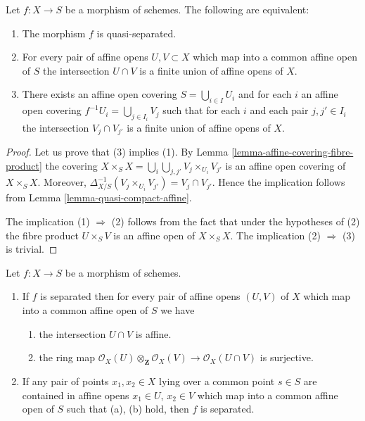 \begin{lemma}
\label{lemma-characterize-quasi-separated}
Let $f : X \to S$ be a morphism of schemes.
The following are equivalent:
\begin{enumerate}
\item The morphism $f$ is quasi-separated.
\item For every pair of affine opens $U, V \subset X$
which map into a common affine open of $S$ the intersection
$U \cap V$ is a finite union of affine opens of $X$.
\item There exists an affine open covering $S = \bigcup_{i \in I} U_i$
and for each $i$ an affine open covering $f^{-1}U_i = \bigcup_{j \in I_i} V_j$
such that for each $i$ and each pair $j, j' \in I_i$ the
intersection $V_j \cap V_{j'}$ is a finite union of affine
opens of $X$.
\end{enumerate}
\end{lemma}

\begin{proof}
Let us prove that (3) implies (1).
By Lemma \ref{lemma-affine-covering-fibre-product}
the covering $X \times_S X = \bigcup_i \bigcup_{j, j'} V_j \times_{U_i} V_{j'}$
is an affine open covering of $X \times_S X$.
Moreover, $\Delta_{X/S}^{-1}(V_j \times_{U_i} V_{j'}) = V_j \cap V_{j'}$.
Hence the implication follows from Lemma \ref{lemma-quasi-compact-affine}.

\medskip\noindent
The implication (1) $\Rightarrow$ (2) follows from the fact
that under the hypotheses of (2) the fibre product
$U \times_S V$ is an affine open of $X \times_S X$.
The implication (2) $\Rightarrow$ (3) is trivial.
\end{proof}

\begin{lemma}
\label{lemma-characterize-separated}
Let $f : X \to S$ be a morphism of schemes.
\begin{enumerate}
\item If $f$ is separated then for every pair of affine
opens $(U, V)$ of $X$ which map into a
common affine open of $S$ we have
\begin{enumerate}
\item the intersection $U \cap V$ is affine.
\item the ring map
$\mathcal{O}_X(U) \otimes_{\mathbf{Z}} \mathcal{O}_X(V)
\to \mathcal{O}_X(U \cap V)$
is surjective.
\end{enumerate}
\item If any pair of points $x_1, x_2 \in X$ lying over a common
point $s \in S$ are contained in affine opens $x_1 \in U$,
$x_2 \in V$ which map into a common affine open of $S$ such
that (a), (b) hold, then $f$ is separated.
\end{enumerate}
\end{lemma}

